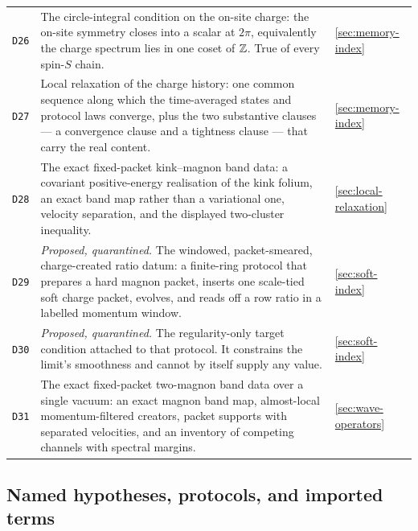{\begin{longtable}{@{}p{}p{}p{}@{}}
\texttt{D26} & The circle-integral condition on the on-site charge: the
on-site symmetry closes into a scalar at $2\pi$, equivalently the charge
spectrum lies in one coset of $\mathbb{Z}$. True of every spin-$S$ chain. & \cref{sec:memory-index}\\

\texttt{D27} & Local relaxation of the charge history: one common sequence
along which the time-averaged states and protocol laws converge, plus the two
substantive clauses --- a convergence clause and a tightness clause --- that
carry the real content. & \cref{sec:memory-index}\\

\texttt{D28} & The exact fixed-packet kink--magnon band data: a covariant
positive-energy realisation of the kink folium, an exact band map rather than
a variational one, velocity separation, and the displayed two-cluster
inequality. & \cref{sec:local-relaxation}\\

\texttt{D29} & \emph{Proposed, quarantined.} The windowed, packet-smeared,
charge-created ratio datum: a finite-ring protocol that prepares a hard
magnon packet, inserts one scale-tied soft charge packet, evolves, and reads
off a row ratio in a labelled momentum window. & \cref{sec:soft-index}\\

\texttt{D30} & \emph{Proposed, quarantined.} The regularity-only target
condition attached to that protocol. It constrains the limit's smoothness and
cannot by itself supply any value. & \cref{sec:soft-index}\\

\texttt{D31} & The exact fixed-packet two-magnon band data over a single
vacuum: an exact magnon band map, almost-local momentum-filtered creators,
packet supports with separated velocities, and an inventory of competing
channels with spectral margins. & \cref{sec:wave-operators}\\
\end{longtable}
}

\subsection{Named hypotheses, protocols, and imported terms}

